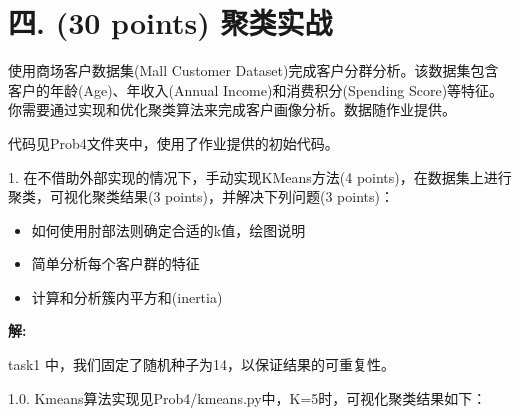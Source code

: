 \documentclass[8pt]{article}
\begin{document}
\section*{四. (30 points) 聚类实战}
使用商场客户数据集(Mall Customer Dataset)完成客户分群分析。该数据集包含客户的年龄(Age)、年收入(Annual Income)和消费积分(Spending Score)等特征。你需要通过实现和优化聚类算法来完成客户画像分析。数据随作业提供。

{\color{red}代码见Prob4文件夹中，使用了作业提供的初始代码。}

1. 在不借助外部实现的情况下，手动实现KMeans方法(4 points)，在数据集上进行聚类，可视化聚类结果(3 points)，并解决下列问题(3 points)：
\begin{itemize}
    \item 如何使用肘部法则确定合适的k值，绘图说明
    \item 简单分析每个客户群的特征
    \item 计算和分析簇内平方和(inertia)
\end{itemize}


\textbf{\large 解:}

task1 中，我们固定了随机种子为14，以保证结果的可重复性。

1.0. Kmeans算法实现见{\color{blue}Prob4/kmeans.py中}，K=5时，可视化聚类结果如下：
\end{document}
